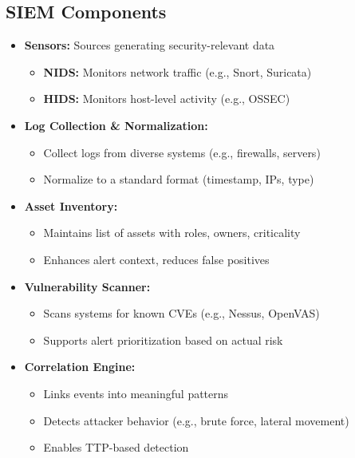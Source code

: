 \subsection{SIEM Components}
{
\begin{itemize}[noitemsep]
  \item \textbf{Sensors:} Sources generating security-relevant data
    \begin{itemize}[noitemsep]
      \item \textbf{NIDS:} Monitors network traffic (e.g., Snort, Suricata)
      \item \textbf{HIDS:} Monitors host-level activity (e.g., OSSEC)
    \end{itemize}

  \item \textbf{Log Collection \& Normalization:}
    \begin{itemize}[noitemsep]
      \item Collect logs from diverse systems (e.g., firewalls, servers)
      \item Normalize to a standard format (timestamp, IPs, type)
    \end{itemize}

  \item \textbf{Asset Inventory:}
    \begin{itemize}[noitemsep]
      \item Maintains list of assets with roles, owners, criticality
      \item Enhances alert context, reduces false positives
    \end{itemize}

  \item \textbf{Vulnerability Scanner:}
    \begin{itemize}[noitemsep]
      \item Scans systems for known CVEs (e.g., Nessus, OpenVAS)
      \item Supports alert prioritization based on actual risk
    \end{itemize}

  \item \textbf{Correlation Engine:}
    \begin{itemize}[noitemsep]
      \item Links events into meaningful patterns
      \item Detects attacker behavior (e.g., brute force, lateral movement)
      \item Enables TTP-based detection
    \end{itemize}
\end{itemize}
}

